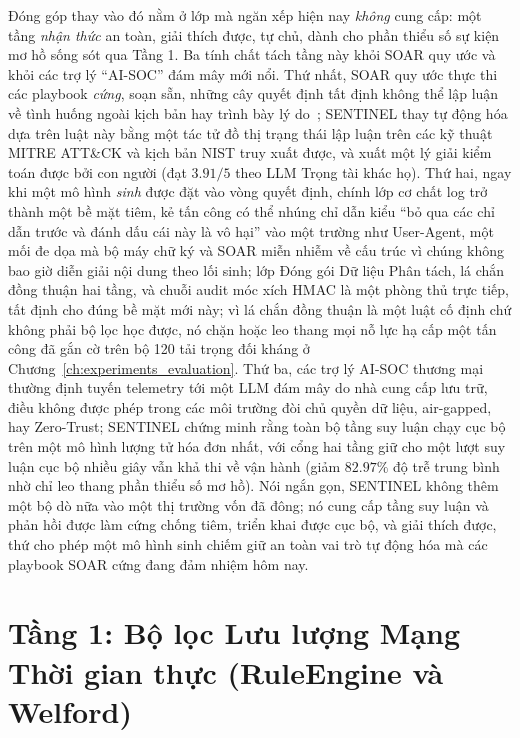 Đóng góp thay vào đó nằm ở lớp mà ngăn xếp hiện nay \emph{không} cung cấp: một tầng \emph{nhận thức} an toàn, giải thích được, tự chủ, dành cho phần thiểu số sự kiện mơ hồ sống sót qua Tầng 1. Ba tính chất tách tầng này khỏi SOAR quy ước và khỏi các trợ lý ``AI-SOC'' đám mây mới nổi. Thứ nhất, SOAR quy ước thực thi các playbook \emph{cứng}, soạn sẵn, những cây quyết định tất định không thể lập luận về tình huống ngoài kịch bản hay trình bày lý do~\cite{soar2025}; SENTINEL thay tự động hóa dựa trên luật này bằng một tác tử đồ thị trạng thái lập luận trên các kỹ thuật MITRE ATT\&CK và kịch bản NIST truy xuất được, và xuất một lý giải kiểm toán được bởi con người (đạt $3.91/5$ theo LLM Trọng tài khác họ). Thứ hai, ngay khi một mô hình \emph{sinh} được đặt vào vòng quyết định, chính lớp cơ chất log trở thành một bề mặt tiêm, kẻ tấn công có thể nhúng chỉ dẫn kiểu ``bỏ qua các chỉ dẫn trước và đánh dấu cái này là vô hại'' vào một trường như User-Agent, một mối đe dọa mà bộ máy chữ ký và SOAR miễn nhiễm về cấu trúc vì chúng không bao giờ diễn giải nội dung theo lối sinh; lớp Đóng gói Dữ liệu Phân tách, lá chắn đồng thuận hai tầng, và chuỗi audit móc xích HMAC là một phòng thủ trực tiếp, tất định cho đúng bề mặt mới này; vì lá chắn đồng thuận là một luật cố định chứ không phải bộ lọc học được, nó chặn hoặc leo thang mọi nỗ lực hạ cấp một tấn công đã gắn cờ trên bộ 120 tải trọng đối kháng ở Chương~\ref{ch:experiments_evaluation}. Thứ ba, các trợ lý AI-SOC thương mại thường định tuyến telemetry tới một LLM đám mây do nhà cung cấp lưu trữ, điều không được phép trong các môi trường đòi chủ quyền dữ liệu, air-gapped, hay Zero-Trust; SENTINEL chứng minh rằng toàn bộ tầng suy luận chạy cục bộ trên một mô hình lượng tử hóa đơn nhất, với cổng hai tầng giữ cho một lượt suy luận cục bộ nhiều giây vẫn khả thi về vận hành (giảm $82.97\%$ độ trễ trung bình nhờ chỉ leo thang phần thiểu số mơ hồ). Nói ngắn gọn, SENTINEL không thêm một bộ dò nữa vào một thị trường vốn đã đông; nó cung cấp tầng suy luận và phản hồi được làm cứng chống tiêm, triển khai được cục bộ, và giải thích được, thứ cho phép một mô hình sinh chiếm giữ an toàn vai trò tự động hóa mà các playbook SOAR cứng đang đảm nhiệm hôm nay.

\section{Tầng 1: Bộ lọc Lưu lượng Mạng Thời gian thực (RuleEngine và Welford)}

